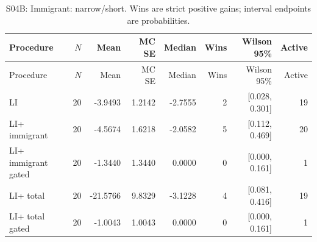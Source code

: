 \begin{longtable}{@{}lrrrrrrr@{}}

\caption{S04B: Immigrant: narrow/short. Wins are strict positive gains; interval endpoints are probabilities.}\label{tab:s04b-4}\\

\toprule Procedure & $N$ & Mean & MC SE & Median & Wins & Wilson 95\% & Active \\

\midrule\endfirsthead

\toprule Procedure & $N$ & Mean & MC SE & Median & Wins & Wilson 95\% & Active \\

\midrule\endhead

\bottomrule\endlastfoot

LI & 20 & -3.9493 & 1.2142 & -2.7555 & 2 & [0.028, 0.301] & 19 \\

LI+ immigrant & 20 & -4.5674 & 1.6218 & -2.0582 & 5 & [0.112, 0.469] & 20 \\

LI+ immigrant gated & 20 & -1.3440 & 1.3440 & 0.0000 & 0 & [0.000, 0.161] & 1 \\

LI+ total & 20 & -21.5766 & 9.8329 & -3.1228 & 4 & [0.081, 0.416] & 19 \\

LI+ total gated & 20 & -1.0043 & 1.0043 & 0.0000 & 0 & [0.000, 0.161] & 1 \\

\end{longtable}\endgroup

\begingroup\footnotesize\setlength{\tabcolsep}{3pt}

